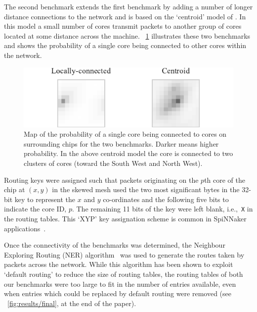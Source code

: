 \documentclass[conference]{IEEEtran}
\newcommand{\mytt}[1]{\texttt{\footnotesize#1}}
\begin{document}
The second benchmark extends the first benchmark by adding a number of longer distance connections to the network and is based on the `centroid' model of \textcite{Navaridas2015}.
In this model a small number of cores transmit packets to another group of cores located at some distance across the machine.
\figurename~\ref{fig:experiment/setup} illustrates these two benchmarks and shows the probability of a single core being connected to other cores within the network.

\begin{figure}
  \centering
  \includegraphics{experiments/experiments.pdf}
  \caption{Map of the probability of a single core being connected to cores on surrounding chips for the two benchmarks. Darker means higher probability.
           In the above centroid model the core is connected to two clusters of cores (toward the South West and North West).}
  \label{fig:experiment/setup}
\end{figure}

Routing keys were assigned such that packets originating on the $p$th core of the chip at $(x, y)$ in the skewed mesh used the two most significant bytes in the 32-bit key to represent the $x$ and $y$ co-ordinates and the following five bits to indicate the core ID, $p$.
The remaining 11 bits of the key were left blank, i.e.,~\mytt{X} in the routing tables.
This `XYP' key assignation scheme is common in SpiNNaker applications~\parencite{Davies2012}.

Once the connectivity of the benchmarks was determined, the Neighbour Exploring Routing (NER) algorithm~\parencite{Navaridas2015} was used to generate the routes taken by packets across the network.
While this algorithm has been shown to exploit `default routing' to reduce the size of routing tables, the routing tables of both our benchmarks were too large to fit in the number of entries available, even when entries which could be replaced by default routing were removed (see \figurename~\ref{fig:results/final}, at the end of the paper).
\end{document}
